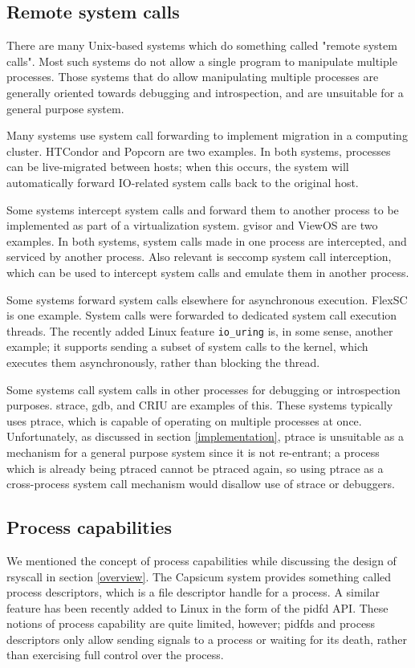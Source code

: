 \documentclass[sigplan]{acmart}
\begin{document}
\subsection{Remote system calls}
There are many Unix-based systems which do something called "remote system calls".
Most such systems do not allow a single program to manipulate multiple processes.
Those systems that do allow manipulating multiple processes
are generally oriented towards debugging and introspection,
and are unsuitable for a general purpose system.

Many systems use system call forwarding to implement migration in a computing cluster.
HTCondor\cite{condor} and Popcorn\cite{popcorn} are two examples.
In both systems, processes can be live-migrated between hosts;
when this occurs, the system will automatically forward IO-related system calls
back to the original host.

Some systems intercept system calls and forward them to another process to be implemented
as part of a virtualization system.
gvisor\cite{gvisor} and ViewOS\cite{viewos} are two examples.
In both systems,
system calls made in one process are intercepted,
and serviced by another process.
Also relevant is seccomp system call interception,
which can be used to intercept system calls and emulate them in another process.

Some systems forward system calls elsewhere for asynchronous execution.
FlexSC\cite{flexsc} is one example.
System calls were forwarded to dedicated system call execution threads.
The recently added Linux feature \verb|io_uring| is, in some sense, another example;
it supports sending a subset of system calls to the kernel,
which executes them asynchronously,
rather than blocking the thread.

Some systems call system calls in other processes for debugging or introspection purposes.
strace, gdb, and CRIU\cite{criu} are examples of this.
These systems typically uses ptrace,
which is capable of operating on multiple processes at once.
Unfortunately, as discussed in section \ref{implementation},
ptrace is unsuitable as a mechanism for a general purpose system since it is not re-entrant;
a process which is already being ptraced cannot be ptraced again,
so using ptrace as a cross-process system call mechanism would disallow use of strace or debuggers.
\subsection{Process capabilities}
We mentioned the concept of process capabilities while discussing the design of rsyscall in section \ref{overview}.
The Capsicum system provides something called process descriptors\cite{capsicum},
which is a file descriptor handle for a process.
A similar feature has been recently added to Linux in the form of the pidfd API\cite{pidfd}.
These notions of process capability are quite limited, however;
pidfds and process descriptors only allow sending signals to a process or waiting for its death,
rather than exercising full control over the process.
\end{document}
